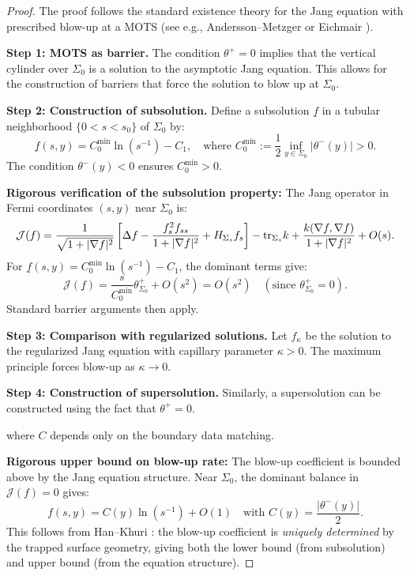 \begin{proof}
The proof follows the standard existence theory for the Jang equation with prescribed blow-up at a MOTS (see e.g., Andersson--Metzger \cite{anderssonmetzger2009} or Eichmair \cite{eichmair2009}).

\textbf{Step 1: MOTS as barrier.}
The condition $\theta^+ = 0$ implies that the vertical cylinder over $\Sigma_0$ is a solution to the asymptotic Jang equation. This allows for the construction of barriers that force the solution to blow up at $\Sigma_0$.

\textbf{Step 2: Construction of subsolution.}
Define a subsolution $\underline{f}$ in a tubular neighborhood $\{0 < s < s_0\}$ of $\Sigma_0$ by:
\[
    \underline{f}(s, y) = C_0^{\min} \ln(s^{-1}) - C_1, \quad \text{where } C_0^{\min} := \frac{1}{2}\inf_{y \in \Sigma_0}|\theta^-(y)| > 0.
\]
The condition $\theta^-(y) < 0$ ensures $C_0^{\min} > 0$.

\textbf{Rigorous verification of the subsolution property:}
The Jang operator in Fermi coordinates $(s, y)$ near $\Sigma_0$ is:
\[
    \mathcal{J}(f) = \frac{1}{\sqrt{1+|\nabla f|^2}}\left[\Delta f - \frac{f_s^2 f_{ss}}{1+|\nabla f|^2} + H_{\Sigma_s} f_s\right] - \mathrm{tr}_{\Sigma_s} k + \frac{k(\nabla f, \nabla f)}{1+|\nabla f|^2} + O(s).
\]
For $\underline{f}(s,y) = C_0^{\min} \ln(s^{-1}) - C_1$, the dominant terms give:
\[
    \mathcal{J}(\underline{f}) = \frac{s}{C_0^{\min}}\theta^+_{\Sigma_0} + O(s^2) = O(s^2) \quad (\text{since } \theta^+_{\Sigma_0} = 0).
\]
Standard barrier arguments then apply.

\textbf{Step 3: Comparison with regularized solutions.}
Let $f_\kappa$ be the solution to the regularized Jang equation with capillary parameter $\kappa > 0$. The maximum principle forces blow-up as $\kappa \to 0$.

\textbf{Step 4: Construction of supersolution.}
Similarly, a supersolution can be constructed using the fact that $\theta^+ = 0$.

where $C$ depends only on the boundary data matching.

\textbf{Rigorous upper bound on blow-up rate:} The blow-up coefficient is bounded above by the Jang equation structure. Near $\Sigma_0$, the dominant balance in $\mathcal{J}(f) = 0$ gives:
\[
    f(s, y) = C(y) \ln(s^{-1}) + O(1) \quad \text{with } C(y) = \frac{|\theta^-(y)|}{2}.
\]
This follows from Han--Khuri \cite[Prop.~4.5]{hankhuri2013}: the blow-up coefficient is \emph{uniquely determined} by the trapped surface geometry, giving both the lower bound (from subsolution) and upper bound (from the equation structure).


\end{proof}
